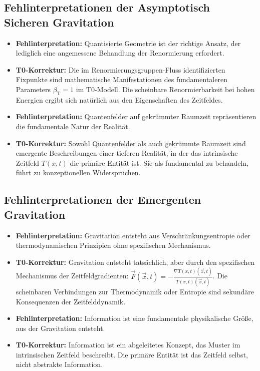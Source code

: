 \documentclass[12pt,a4paper]{article}
\newcommand{\Tfieldt}{T(x,t)}
\newcommand{\betaT}{\beta_{\text{T}}}
\newcommand{\vecx}{\vec{x}}
\begin{document}
	\subsection{Fehlinterpretationen der Asymptotisch Sicheren Gravitation}
	\label{subsec:asg_misinterpretations}
	
	\begin{itemize}
		\item \textbf{Fehlinterpretation:} Quantisierte Geometrie ist der richtige Ansatz, der lediglich eine angemessene Behandlung der Renormierung erfordert.
		\item \textbf{T0-Korrektur:} Die im Renormierungsgruppen-Fluss identifizierten Fixpunkte sind mathematische Manifestationen des fundamentaleren Parameters $\betaT = 1$ im T0-Modell. Die scheinbare Renormierbarkeit bei hohen Energien ergibt sich natürlich aus den Eigenschaften des Zeitfeldes.
		
		\item \textbf{Fehlinterpretation:} Quantenfelder auf gekrümmter Raumzeit repräsentieren die fundamentale Natur der Realität.
		\item \textbf{T0-Korrektur:} Sowohl Quantenfelder als auch gekrümmte Raumzeit sind emergente Beschreibungen einer tieferen Realität, in der das intrinsische Zeitfeld $\Tfieldt$ die primäre Entität ist. Sie als fundamental zu behandeln, führt zu konzeptionellen Widersprüchen.
	\end{itemize}
	
	\subsection{Fehlinterpretationen der Emergenten Gravitation}
	\label{subsec:emergent_misinterpretations}
	
	\begin{itemize}
		\item \textbf{Fehlinterpretation:} Gravitation entsteht aus Verschränkungsentropie oder thermodynamischen Prinzipien ohne spezifischen Mechanismus.
		\item \textbf{T0-Korrektur:} Gravitation entsteht tatsächlich, aber durch den spezifischen Mechanismus der Zeitfeldgradienten: $\vec{F}(\vecx,t) = -\frac{\nabla\Tfieldt(\vecx,t)}{\Tfieldt(\vecx,t)}$. Die scheinbaren Verbindungen zur Thermodynamik oder Entropie sind sekundäre Konsequenzen der Zeitfelddynamik.
		
		\item \textbf{Fehlinterpretation:} Information ist eine fundamentale physikalische Größe, aus der Gravitation entsteht.
		\item \textbf{T0-Korrektur:} Information ist ein abgeleitetes Konzept, das Muster im intrinsischen Zeitfeld beschreibt. Die primäre Entität ist das Zeitfeld selbst, nicht abstrakte Information.
	\end{itemize}
	
\end{document}
